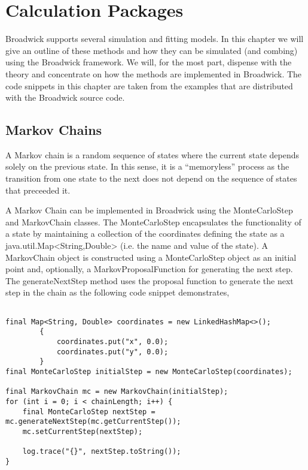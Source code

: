 \chapter{Calculation Packages}

Broadwick supports several simulation and fitting models. In this chapter we will give an outline of these methods and how they can be simulated (and combing) using the Broadwick framework. We will, for the most part, dispense with the theory and concentrate on how the methods are implemented in Broadwick. The code snippets in this chapter are taken from the examples that are distributed with the Broadwick source code.



\section{Markov Chains}

A Markov chain is a random sequence of states where the current state depends solely on the previous state. In this sense, it is a ``memoryless'' process as the transition from one state to the next does not depend on the sequence of states that preceeded it.

A Markov Chain can be implemented in Broadwick using the MonteCarloStep and MarkovChain classes. The MonteCarloStep encapsulates the functionality of a state by maintaining a collection of the coordinates defining the state as a java.util.Map<String,Double> (i.e. the name and value of the state). A MarkovChain object is constructed using a MonteCarloStep object as an initial point and, optionally, a MarkovProposalFunction for generating the next step. The generateNextStep method uses the proposal function to generate the next step in the chain as the following code snippet demonstrates,

\begin{lstlisting}

final Map<String, Double> coordinates = new LinkedHashMap<>();
        {
            coordinates.put("x", 0.0);
            coordinates.put("y", 0.0);
        }
final MonteCarloStep initialStep = new MonteCarloStep(coordinates);

final MarkovChain mc = new MarkovChain(initialStep);
for (int i = 0; i < chainLength; i++) {
    final MonteCarloStep nextStep = mc.generateNextStep(mc.getCurrentStep());
    mc.setCurrentStep(nextStep);

    log.trace("{}", nextStep.toString());
}
\end{lstlisting}

